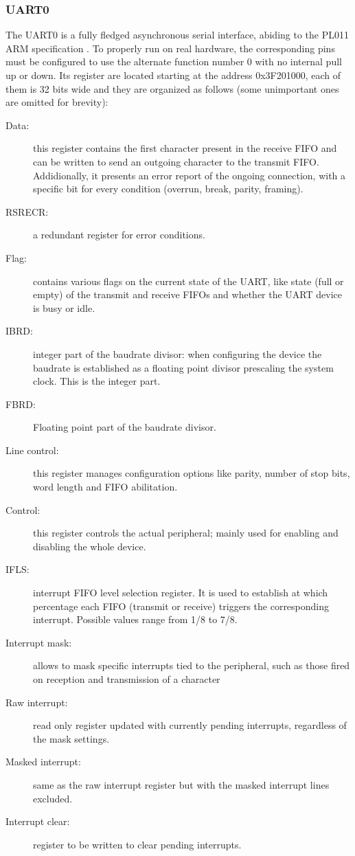 \documentclass[12pt,a4paper,openright,twoside]{report}
\begin{document}
\subsubsection{UART0}
The UART0 is a fully fledged asynchronous serial interface, abiding to the 
PL011 ARM specification \cite{pl011}. To properly run on real hardware, the
corresponding pins must be configured to use the alternate function number 0 with
no internal pull up or down.
Its register are located starting at the address 0x3F201000, each of them
is 32 bits wide and they are organized as follows (some unimportant ones are omitted for brevity):
\begin{description}
    \item[Data:] this register contains the first character present in 
            the receive FIFO and can be written to send an outgoing character to 
            the transmit FIFO. Addidionally, it presents an error report of the ongoing
            connection, with a specific bit for every condition (overrun, break,
            parity, framing).
    \item[RSRECR:] a redundant register for error conditions.
    \item[Flag:] contains various flags on the current state of the UART, like 
            state (full or empty) of the transmit and receive FIFOs and whether
            the UART device is busy or idle.
    \item[IBRD:] integer part of the baudrate divisor: when configuring the device
            the baudrate is established as a floating point divisor prescaling
            the system clock. This is the integer part.
    \item[FBRD:] Floating point part of the baudrate divisor.
    \item[Line control:] this register manages configuration options like
            parity, number of stop bits, word length and FIFO abilitation.
    \item[Control:] this register controls the actual peripheral; mainly used
            for enabling and disabling the whole device.
    \item[IFLS:] interrupt FIFO level selection register. It is used to establish 
            at which percentage each FIFO (transmit or receive) triggers the
            corresponding interrupt. Possible values range from 1/8 to 7/8.
    \item[Interrupt mask:] allows to mask specific interrupts tied to the peripheral,
            such as those fired on reception and transmission of a character
    \item[Raw interrupt:] read only register updated with currently pending
            interrupts, regardless of the mask settings.
    \item[Masked interrupt:] same as the raw interrupt register but with the
            masked interrupt lines excluded.
    \item[Interrupt clear:] register to be written to clear pending interrupts.
\end{description}
\end{document}
